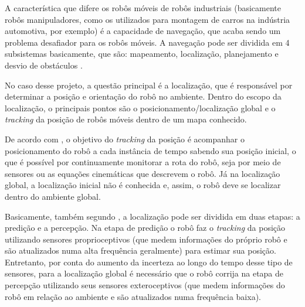 \documentclass[acronym, symbols, table]{fei}
\begin{document}
	A característica que difere os robôs móveis de robôs industriais (basicamente robôs manipuladores, como os utilizados para montagem de carros na indústria automotiva, por exemplo) é a capacidade de navegação, que acaba sendo um problema desafiador para os robôs móveis. A navegação pode ser dividida em 4 subsistemas basicamente, que são: mapeamento, localização, planejamento e desvio de obstáculos \cite{app12146951}. 
	
	No caso desse projeto, a questão principal é a localização, que é responsável por determinar a posição e orientação do robô no ambiente. Dentro do escopo da localização, o principais pontos são o posicionamento/localização global e o \textit{tracking} da posição de robôs móveis dentro de um mapa conhecido.
	
	De acordo com \textcite{PANIGRAHI20226019}, o objetivo do \textit{tracking} da posição é acompanhar o posicionamento do robô a cada instância de tempo sabendo sua posição inicial, o que é possível por continuamente monitorar a rota do robô, seja por meio de sensores ou as equações cinemáticas que descrevem o robô. Já na localização global, a localização inicial não é conhecida e, assim, o robô deve se localizar dentro do ambiente global.
	
	
	Basicamente, também segundo \textcite{PANIGRAHI20226019}, a localização pode ser dividida em duas etapas: a predição e a percepção. Na etapa de predição o robô faz o \textit{tracking} da posição utilizando sensores proprioceptivos (que medem informações do próprio robô e são atualizados numa alta frequência geralmente) para estimar sua posição. Entretanto, por conta do aumento da incerteza ao longo do tempo desse tipo de sensores, para a localização global é necessário que o robô corrija na etapa de percepção utilizando seus sensores exteroceptivos (que medem informações do robô em relação ao ambiente e são atualizados numa frequência baixa).
	
\end{document}
